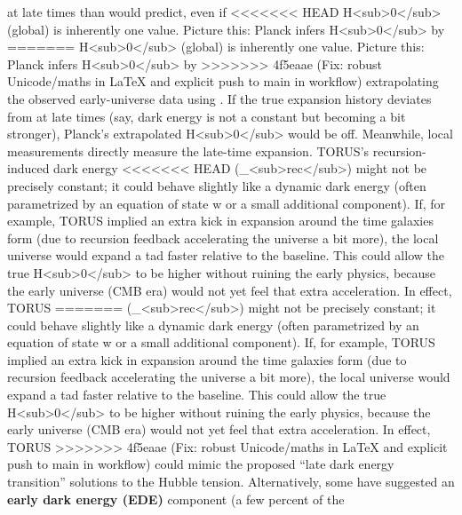 \documentclass[]{article}
\begin{document}
\begin{enumerate}
  at late times than  would predict, even if
<<<<<<< HEAD
  H\textless sub\textgreater0\textless/sub\textgreater{} (global) is
  inherently one value. Picture this: Planck infers
  H\textless sub\textgreater0\textless/sub\textgreater{} by
=======
  H\textless{}sub\textgreater{}0\textless{}/sub\textgreater{} (global)
  is inherently one value. Picture this: Planck infers
  H\textless{}sub\textgreater{}0\textless{}/sub\textgreater{} by
>>>>>>> 4f5eaae (Fix: robust Unicode/maths in LaTeX and explicit push to main in workflow)
  extrapolating the observed early-universe data using . If the true
  expansion history deviates from  at late times (say, dark energy
  is not a constant but becoming a bit stronger), Planck's extrapolated
  H\textless{}sub\textgreater{}0\textless{}/sub\textgreater{} would be
  off. Meanwhile, local measurements directly measure the late-time
  expansion. TORUS's recursion-induced dark energy
<<<<<<< HEAD
  (\Lambda\_\textless sub\textgreater rec\textless/sub\textgreater) might not
  be precisely constant; it could behave slightly like a dynamic dark
  energy (often parametrized by an equation of state w or a small
  additional component). If, for example, TORUS implied an extra kick in
  expansion around the time galaxies form (due to recursion feedback
  accelerating the universe a bit more), the local universe would expand
  a tad faster relative to the  baseline. This could allow the true
  H\textless sub\textgreater0\textless/sub\textgreater{} to be higher
  without ruining the early physics, because the early universe (CMB
  era) would not yet feel that extra acceleration. In effect, TORUS
=======
  (\Lambda\_\textless{}sub\textgreater{}rec\textless{}/sub\textgreater{})
  might not be precisely constant; it could behave slightly like a
  dynamic dark energy (often parametrized by an equation of state w or a
  small additional component). If, for example, TORUS implied an extra
  kick in expansion around the time galaxies form (due to recursion
  feedback accelerating the universe a bit more), the local universe
  would expand a tad faster relative to the  baseline. This could
  allow the true
  H\textless{}sub\textgreater{}0\textless{}/sub\textgreater{} to be
  higher without ruining the early physics, because the early universe
  (CMB era) would not yet feel that extra acceleration. In effect, TORUS
>>>>>>> 4f5eaae (Fix: robust Unicode/maths in LaTeX and explicit push to main in workflow)
  could mimic the proposed ``late dark energy transition'' solutions to
  the Hubble tension. Alternatively, some have suggested an
  \textbf{early dark energy (EDE)} component (a few percent of the

\end{enumerate}
\end{document}
